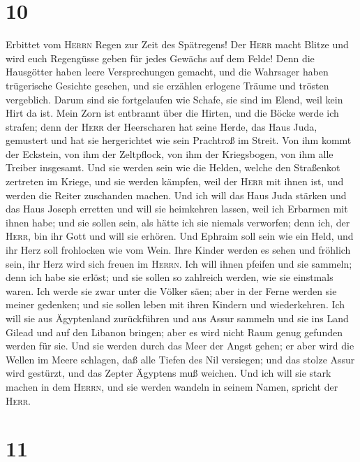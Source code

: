 \hypertarget{section-9}{%
\section{10}\label{section-9}}

 Erbittet vom \textsc{Herrn} Regen zur Zeit des
Spätregens! Der \textsc{Herr} macht Blitze und wird euch Regengüsse
geben für jedes Gewächs auf dem Felde!  Denn die
Hausgötter haben leere Versprechungen gemacht, und die Wahrsager haben
trügerische Gesichte gesehen, und sie erzählen erlogene Träume und
trösten vergeblich. Darum sind sie fortgelaufen wie Schafe, sie sind im
Elend, weil kein Hirt da ist.  Mein Zorn ist entbrannt
über die Hirten, und die Böcke werde ich strafen; denn der \textsc{Herr}
der Heerscharen hat seine Herde, das Haus Juda, gemustert und hat sie
hergerichtet wie sein Prachtroß im Streit.  Von ihm kommt
der Eckstein, von ihm der Zeltpflock, von ihm der Kriegsbogen, von ihm
alle Treiber insgesamt.  Und sie werden sein wie die
Helden, welche den Straßenkot zertreten im Kriege, und sie werden
kämpfen, weil der \textsc{Herr} mit ihnen ist, und werden die Reiter
zuschanden machen.  Und ich will das Haus Juda stärken und
das Haus Joseph erretten und will sie heimkehren lassen, weil ich
Erbarmen mit ihnen habe; und sie sollen sein, als hätte ich sie niemals
verworfen; denn ich, der \textsc{Herr}, bin ihr Gott und will sie
erhören.  Und Ephraim soll sein wie ein Held, und ihr Herz
soll frohlocken wie vom Wein. Ihre Kinder werden es sehen und fröhlich
sein, ihr Herz wird sich freuen im \textsc{Herrn}.  Ich
will ihnen pfeifen und sie sammeln; denn ich habe sie erlöst; und sie
sollen so zahlreich werden, wie sie einstmals waren.  Ich
werde sie zwar unter die Völker säen; aber in der Ferne werden sie
meiner gedenken; und sie sollen leben mit ihren Kindern und
wiederkehren.  Ich will sie aus Ägyptenland zurückführen
und aus Assur sammeln und sie ins Land Gilead und auf den Libanon
bringen; aber es wird nicht Raum genug gefunden werden für sie.
 Und sie werden durch das Meer der Angst gehen; er aber
wird die Wellen im Meere schlagen, daß alle Tiefen des Nil versiegen;
und das stolze Assur wird gestürzt, und das Zepter Ägyptens muß weichen.
 Und ich will sie stark machen in dem \textsc{Herrn}, und
sie werden wandeln in seinem Namen, spricht der \textsc{Herr}.

\hypertarget{section-10}{%
\section{11}\label{section-10}}


